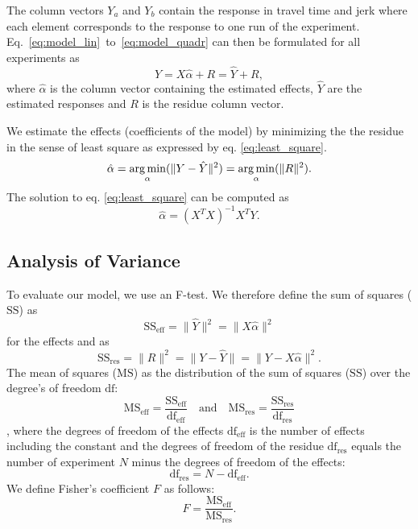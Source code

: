 The column vectors $Y_a$ and $Y_b$ contain the response in travel time and jerk where each element corresponds to the response to one run of the experiment.
Eq.~\ref{eq:model_lin}~to~\ref{eq:model_quadr} can then be formulated for all experiments as
\begin{equation}
 Y = X \hat{\alpha} + R = \hat{Y} + R,
\end{equation}
where $\hat{\alpha}$ is the column vector containing the estimated effects, $\hat{Y}$ are the estimated responses and $R$ is the residue column vector.

We estimate the effects (coefficients of the model) by minimizing the the residue in the sense of least square as expressed by eq. \ref{eq:least_square}.
\begin{equation}\label{eq:least_square}
	\hat\alpha =  \operatorname*{arg\,min}_{\alpha}(\|Y - \hat{Y}\|^2) = \operatorname*{arg\,min}_{\alpha}(\|R\|^2).
\end{equation}
The solution to eq. \ref{eq:least_square} can be computed as
\begin{equation}
	\hat\alpha = (X^T X)^{-1} X^{T} Y.
\end{equation}



\subsection{Analysis of Variance}
To evaluate our model, we use an F-test. We therefore define the sum of squares ($\text{SS}$) as
\begin{equation}
	\text{SS}_\text{eff} = \| \hat{Y} \|^2 = \| X \hat{\alpha} \|^2
\end{equation}
for the effects and as
\begin{equation}
	\text{SS}_\text{res} = \| R \|^2 = \| Y - \hat{Y} \| = \| Y - X \hat{\alpha} \|^2.
\end{equation}
The mean of squares ($\text{MS}$) as the distribution of the sum of squares ($\text{SS}$) over the degree's of freedom $\text{df}$:
\begin{equation}
	\text{MS}_\text{eff} = \frac{\text{SS}_\text{eff}}{\text{df}_\text{eff}} \quad \text{and} \quad 
	\text{MS}_\text{res} = \frac{\text{SS}_\text{res}}{\text{df}_\text{res}}
\end{equation},
where the degrees of freedom of the effects $\text{df}_\text{eff}$ is the number of effects including the constant and the degrees of freedom of the residue $\text{df}_\text{res}$ equals the number of experiment $N$ minus the degrees of freedom of the effects:
\begin{equation}
\text{df}_\text{res} = N - \text{df}_\text{eff}.
\end{equation}
We define Fisher's coefficient $F$ as follows:
\begin{equation}
F = \frac{\text{MS}_\text{eff}}{\text{MS}_\text{res}}.
\end{equation}


